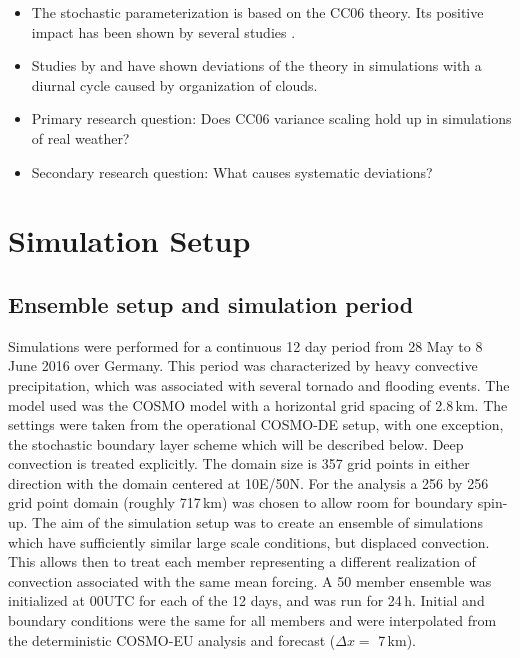 \documentclass[a4paper, 12pt]{article}
\begin{document}
\begin{itemize}
\item The \cite{Plant2008} stochastic parameterization is based on the CC06 theory. Its positive impact has been shown by several studies \citep{Kober2015, Selz2015b, Wang2016}.
\item Studies by \cite{Davoudi2010} and \cite{Davies2008} have shown deviations of the theory in simulations with a diurnal cycle caused by organization of clouds. 
\end{itemize}

\begin{itemize}
 \item Primary research question: Does CC06 variance scaling hold up in simulations of real weather?
 \item Secondary research question: What causes systematic deviations?
\end{itemize}


\section{Simulation Setup}
\subsection{Ensemble setup and simulation period}
Simulations were performed for a continuous 12 day period from 28 May to 8 June 2016 over Germany. This period was characterized by heavy convective precipitation, which was associated with several tornado and flooding events. The model used was the COSMO model \citep{Baldauf2011} with a horizontal grid spacing of 2.8\,km. The settings were taken from the operational COSMO-DE setup, with one exception, the stochastic boundary layer scheme which will be described below. Deep convection is treated explicitly. The domain size is 357 grid points in either direction with the domain centered at 10E/50N. For the analysis a 256 by 256 grid point domain (roughly 717\,km) was chosen to allow room for boundary spin-up. The aim of the simulation setup was to create an ensemble of simulations which have sufficiently similar large scale conditions, but displaced convection. This allows then to treat each member representing a different realization of convection associated with the same mean forcing. A 50 member ensemble was initialized at 00UTC for each of the 12 days, and was run for 24\,h. Initial and boundary conditions were the same for all members and were interpolated from the deterministic COSMO-EU analysis and forecast ($\Delta x =$ 7\,km). 
\end{document}
